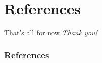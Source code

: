 \documentclass{beamer}
\begin{document}
\logo{} %
\section{References}

\begin{frame}{That's all for now}
\centering \Huge
\emph{Thank you!}
\end{frame}

\begin{frame}[t, allowframebreaks]
\frametitle{References}


\end{frame}
\end{document}
